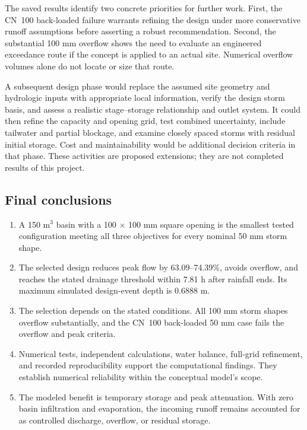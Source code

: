 \documentclass[11pt,letterpaper]{article}
\begin{document}
The saved results identify two concrete priorities for further work. First,
the CN~100 back-loaded failure warrants refining the design under more
conservative runoff assumptions before asserting a robust recommendation.
Second, the substantial 100 mm overflow shows the need to evaluate an
engineered exceedance route if the concept is applied to an actual site.
Numerical overflow volumes alone do not locate or size that route.

A subsequent design phase would replace the assumed site geometry and
hydrologic inputs with appropriate local information, verify the design
storm basis, and assess a realistic stage--storage relationship and outlet
system. It could then refine the capacity and opening grid, test combined
uncertainty, include tailwater and partial blockage, and examine closely
spaced storms with residual initial storage. Cost and maintainability would
be additional decision criteria in that phase. These activities are proposed
extensions; they are not completed results of this project.

\subsection{Final conclusions}
\begin{enumerate}
\item A 150 m$^3$ basin with a 100 $\times$ 100 mm square opening is the
smallest tested configuration meeting all three objectives for every nominal
50 mm storm shape.
\item The selected design reduces peak flow by 63.09--74.39\%, avoids
overflow, and reaches the stated drainage threshold within 7.81 h after
rainfall ends. Its maximum simulated design-event depth is 0.6888 m.
\item The selection depends on the stated conditions. All 100 mm storm
shapes overflow substantially, and the CN~100 back-loaded 50 mm case fails
the overflow and peak criteria.
\item Numerical tests, independent calculations, water balance, full-grid
refinement, and recorded reproducibility support the computational findings.
They establish numerical reliability within the conceptual model's scope.
\item The modeled benefit is temporary storage and peak attenuation.
With zero basin infiltration and evaporation, the incoming runoff remains
accounted for as controlled discharge, overflow, or residual storage.
\end{enumerate}
\end{document}

